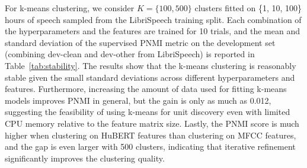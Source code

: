 For k-means clustering, we consider $K=\{100,500\}$ clusters fitted on \{1, 10, 100\} hours of speech sampled from the LibriSpeech training split. Each combination of the hyperparameters and the features are trained for 10 trials, and the mean and standard deviation of the supervised PNMI metric on the development set (combining dev-clean and dev-other from LibriSpeech) is reported in Table~\ref{tab:stability}.
The results show that the k-means clustering is reasonably stable given the small standard deviations across different hyperparameters and features. Furthermore, increasing the amount of data used for fitting k-means models improves PNMI in general, but the gain is only as much as 0.012, suggesting the feasibility of using k-means for unit discovery even with limited CPU memory relative to the feature matrix size. Lastly, the PNMI score is much higher when clustering on HuBERT features than clustering on MFCC features, and the gap is even larger with 500 clusters, indicating that iterative refinement significantly improves the clustering quality.

